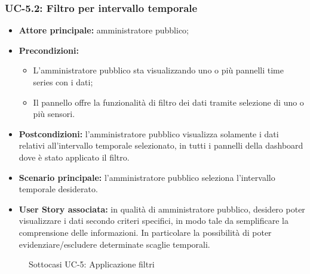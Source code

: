 \documentclass[8pt]{article}
\begin{document}
\subsubsection*{UC-5.2: Filtro per intervallo temporale}
\begin{itemize}
    \item \textbf{Attore principale:} amministratore pubblico;
    \item \textbf{Precondizioni:}
    \begin{itemize}
        \item L’amministratore pubblico sta visualizzando uno o più pannelli time series con i dati;
        \item Il pannello offre la funzionalità di filtro dei dati tramite selezione di uno o più sensori.
    \end{itemize}
    \item \textbf{Postcondizioni:} l’amministratore pubblico visualizza solamente i dati relativi all’intervallo
temporale selezionato, in tutti i pannelli della dashboard dove è stato applicato il filtro.
    \item \textbf{Scenario principale: }l’amministratore pubblico seleziona l’intervallo temporale desiderato.
    \item \textbf{User Story associata:} in qualità di amministratore pubblico, desidero poter
        visualizzare i dati secondo criteri specifici, in modo tale da semplificare la comprensione
        delle informazioni. In particolare la possibilità di poter evidenziare/escludere determinate
        scaglie temporali.
\end{itemize}

\begin{figure}[ht!]
    \centering
    \caption{Sottocasi UC-5: Applicazione filtri}
    \label{fig:Sottocasi UC-5: Applicazione filtri}
\end{figure}
\end{document}
